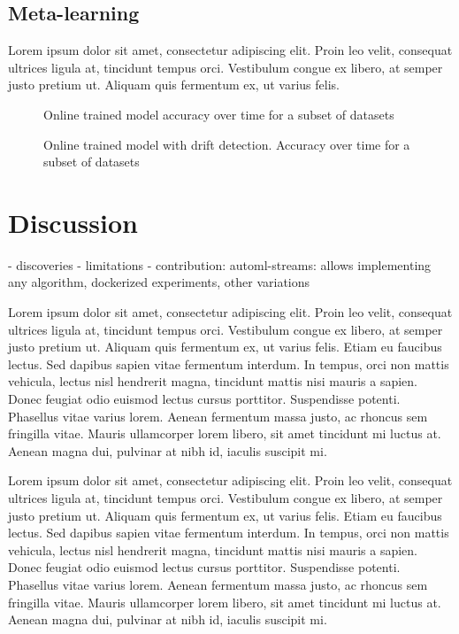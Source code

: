 \documentclass{sig-alternate-br}
\begin{document}
\subsection{Meta-learning}

Lorem ipsum dolor sit amet, consectetur adipiscing elit. Proin leo velit, consequat ultrices ligula at, tincidunt tempus orci. Vestibulum congue ex libero, at semper justo pretium ut. Aliquam quis fermentum ex, ut varius felis.

\begin{figure}[h]
\centering 
{}
\caption{Online trained model accuracy over time for a subset of datasets}
\label{fig:online_ht}
\end{figure}

\begin{figure}[h]
\centering 
{}
\caption{Online trained model with drift detection. Accuracy over time for a subset of datasets}
\label{fig:online_hat}
\end{figure}


\section{Discussion}

- discoveries
- limitations
- contribution: automl-streams: allows implementing any algorithm, dockerized experiments, other variations

Lorem ipsum dolor sit amet, consectetur adipiscing elit. Proin leo velit, consequat ultrices ligula at, tincidunt tempus orci. Vestibulum congue ex libero, at semper justo pretium ut. Aliquam quis fermentum ex, ut varius felis. Etiam eu faucibus lectus. Sed dapibus sapien vitae fermentum interdum. In tempus, orci non mattis vehicula, lectus nisl hendrerit magna, tincidunt mattis nisi mauris a sapien. Donec feugiat odio euismod lectus cursus porttitor. Suspendisse potenti. Phasellus vitae varius lorem. Aenean fermentum massa justo, ac rhoncus sem fringilla vitae. Mauris ullamcorper lorem libero, sit amet tincidunt mi luctus at. Aenean magna dui, pulvinar at nibh id, iaculis suscipit mi.

Lorem ipsum dolor sit amet, consectetur adipiscing elit. Proin leo velit, consequat ultrices ligula at, tincidunt tempus orci. Vestibulum congue ex libero, at semper justo pretium ut. Aliquam quis fermentum ex, ut varius felis. Etiam eu faucibus lectus. Sed dapibus sapien vitae fermentum interdum. In tempus, orci non mattis vehicula, lectus nisl hendrerit magna, tincidunt mattis nisi mauris a sapien. Donec feugiat odio euismod lectus cursus porttitor. Suspendisse potenti. Phasellus vitae varius lorem. Aenean fermentum massa justo, ac rhoncus sem fringilla vitae. Mauris ullamcorper lorem libero, sit amet tincidunt mi luctus at. Aenean magna dui, pulvinar at nibh id, iaculis suscipit mi.
\end{document}
